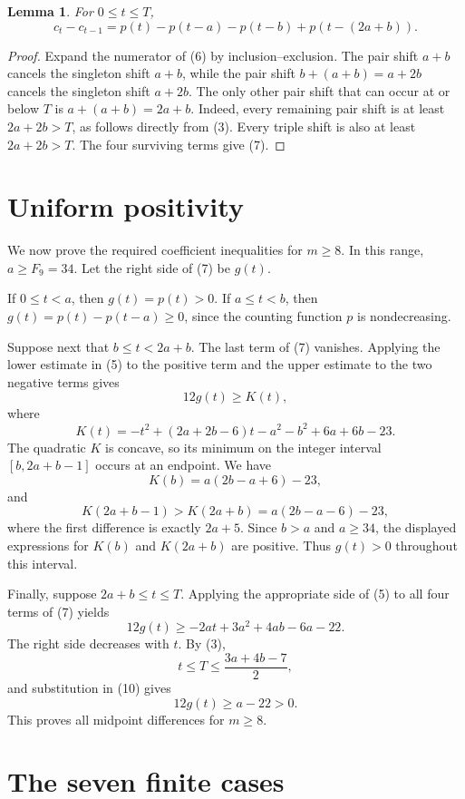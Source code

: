 \documentclass[11pt]{article}
\newtheorem{lemma}[theorem]{Lemma}
\begin{document}
\begin{lemma}\label{lem:difference}
For \(0\leq t\leq T\),
\[
 c_t-c_{t-1}
 =p(t)-p(t-a)-p(t-b)+p(t-(2a+b)). \tag{7}
\]
\end{lemma}

\begin{proof}
Expand the numerator of (6) by inclusion--exclusion.  The pair shift
\(a+b\) cancels the singleton shift \(a+b\), while the pair shift
\(b+(a+b)=a+2b\) cancels the singleton shift \(a+2b\).  The only other pair
shift that can occur at or below \(T\) is \(a+(a+b)=2a+b\).  Indeed, every
remaining pair shift is at least \(2a+2b>T\), as follows directly from (3).
Every triple shift is also at least \(2a+2b>T\).  The four surviving terms
give (7).
\end{proof}

\section{Uniform positivity}

We now prove the required coefficient inequalities for \(m\geq8\).  In this
range, \(a\geq F_9=34\).  Let the right side of (7) be \(g(t)\).

If \(0\leq t<a\), then \(g(t)=p(t)>0\).  If \(a\leq t<b\), then
\(g(t)=p(t)-p(t-a)\geq0\), since the counting function \(p\) is
nondecreasing.

Suppose next that \(b\leq t<2a+b\).  The last term of (7) vanishes.  Applying
the lower estimate in (5) to the positive term and the upper estimate to the
two negative terms gives
\[
 12g(t)\geq K(t), \tag{8}
\]
where
\[
 K(t)=-t^2+(2a+2b-6)t-a^2-b^2+6a+6b-23.
\]
The quadratic \(K\) is concave, so its minimum on the integer interval
\([b,2a+b-1]\) occurs at an endpoint.  We have
\[
 K(b)=a(2b-a+6)-23,
\]
and
\[
 K(2a+b-1)>K(2a+b)=a(2b-a-6)-23, \tag{9}
\]
where the first difference is exactly \(2a+5\).  Since \(b>a\) and
\(a\geq34\), the displayed expressions for \(K(b)\) and \(K(2a+b)\) are
positive.  Thus \(g(t)>0\) throughout this interval.

Finally, suppose \(2a+b\leq t\leq T\).  Applying the appropriate side of
(5) to all four terms of (7) yields
\[
 12g(t)\geq -2at+3a^2+4ab-6a-22. \tag{10}
\]
The right side decreases with \(t\).  By (3),
\[
 t\leq T\leq\frac{3a+4b-7}{2},
\]
and substitution in (10) gives
\[
 12g(t)\geq a-22>0. \tag{11}
\]
This proves all midpoint differences for \(m\geq8\).

\section{The seven finite cases}
\end{document}
